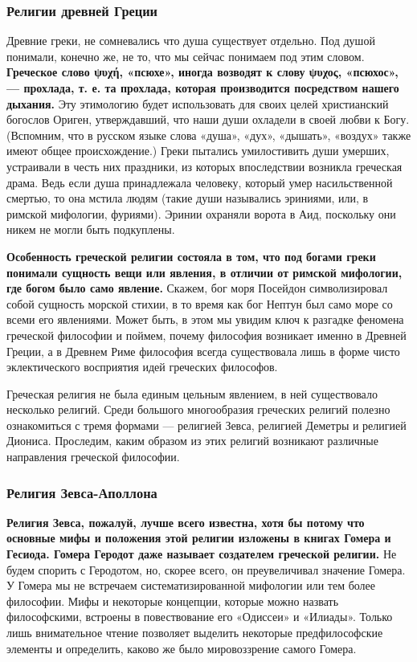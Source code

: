     \subsubsection{Религии древней Греции}	
    Древние греки, не сомневались что душа существует отдельно. Под душой понимали, 
	конечно же, не то, что мы сейчас 
	понимаем под этим словом. \textbf{Греческое слово ψυχή, «псюхе», иногда возводят к слову 
	ψυχος, «псюхос», — прохлада, т. е. та прохлада, которая производится посредством нашего 
	дыхания.} Эту этимологию будет использовать для своих целей христианский богослов Ориген, 
	утверждавший, что наши души охладели в своей любви к Богу. (Вспомним, что в русском 
	языке слова «душа», «дух», «дышать», «воздух» также имеют общее происхождение.) Греки 
	пытались умилостивить души умерших, устраивали в честь них праздники, из которых 
	впоследствии возникла греческая драма. Ведь если душа принадлежала человеку, который 
	умер насильственной смертью, то она мстила людям (такие души назывались эриниями, или, 
	в римской мифологии, фуриями). Эринии охраняли ворота в Аид, поскольку они никем не 
	могли быть подкуплены. 
    
    \par \textbf{Особенность греческой религии состояла в том, что под богами греки понимали 
	сущность вещи или явления, в отличии от римской мифологии, где богом было само явление.} 
	Скажем, 
	бог моря Посейдон символизировал собой сущность морской стихии, в то время как бог Нептун 
	был само море со всеми его явлениями. Может быть, в этом мы увидим ключ к разгадке 
	феномена греческой философии и поймем, почему философия возникает именно в Древней 
	Греции, а в Древнем Риме философия всегда существовала лишь в форме чисто эклектического 
	восприятия идей греческих философов.
    
    \par Греческая религия не была единым цельным явлением, в ней существовало несколько 
	религий. Среди большого многообразия греческих религий полезно ознакомиться с тремя 
	формами — религией Зевса, религией Деметры и религией Диониса. Проследим, каким образом 
	из этих религий возникают различные направления греческой философии.
    
    \subsubsection{Религия Зевса-Аполлона}
    
    \par \textbf{Религия Зевса, пожалуй, лучше всего известна, хотя бы потому что основные мифы 
	и положения этой религии изложены в книгах Гомера и Гесиода. Гомера Геродот даже 
	называет создателем греческой религии.} Не будем спорить с Геродотом, но, скорее всего, 
	он преувеличивал значение Гомера. У Гомера мы не встречаем систематизированной мифологии 
	или тем более философии. Мифы и некоторые концепции, которые можно назвать философскими, 
	встроены в повествование его «Одиссеи» и «Илиады». Только лишь внимательное чтение 
	позволяет выделить некоторые предфилософские элементы и определить, каково же было 
	мировоззрение самого Гомера.
    
